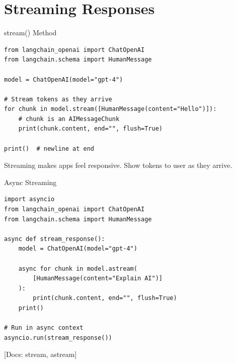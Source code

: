 \documentclass[aspectratio=169,11pt]{beamer}
\newcommand{\docref}[1]{{\scriptsize\color{docgray}[Docs: #1]}}
\begin{document}
\section{Streaming Responses}

\begin{frame}[fragile]{stream() Method}
  \begin{codebox}
    \begin{lstlisting}
from langchain_openai import ChatOpenAI
from langchain.schema import HumanMessage

model = ChatOpenAI(model="gpt-4")

# Stream tokens as they arrive
for chunk in model.stream([HumanMessage(content="Hello")]):
    # chunk is an AIMessageChunk
    print(chunk.content, end="", flush=True)

print()  # newline at end
    \end{lstlisting}
  \end{codebox}

  \begin{tipbox}
    Streaming makes apps feel responsive. Show tokens to user as they arrive.
  \end{tipbox}
\end{frame}

\begin{frame}[fragile]{Async Streaming}
  \begin{codebox}
    \begin{lstlisting}
import asyncio
from langchain_openai import ChatOpenAI
from langchain.schema import HumanMessage

async def stream_response():
    model = ChatOpenAI(model="gpt-4")

    async for chunk in model.astream(
        [HumanMessage(content="Explain AI")]
    ):
        print(chunk.content, end="", flush=True)
    print()

# Run in async context
asyncio.run(stream_response())
    \end{lstlisting}
  \end{codebox}

  \docref{stream, astream}
\end{frame}

\end{document}
